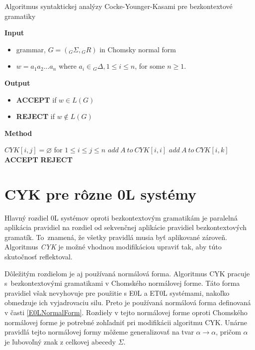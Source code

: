 \begin{algorithm}
\caption{Algoritmus syntaktickej analýzy Cocke-Younger-Kasami pre bezkontextové gramatiky}
\label{CYKBKG}

\textbf{Input}
\begin{itemize}[noitemsep]
    \item grammar, \(G = ({}_G\Sigma, {}_GR)\) in Chomsky normal form
    \item \(w = a_1a_2...a_n\)  where  \(a_i \in {}_G\Delta, 1 \leq i \leq n \), for some \(n \geq 1\).
\end{itemize}
\textbf{Output} 
\begin{itemize}[noitemsep]
    \item \textbf{ACCEPT} if \(w \in L(G)\)
    \item \textbf{REJECT} if \(w\notin L(G)\)
\end{itemize}
\textbf{Method}
\begin{algorithmic}
\State $ CYK[i,j] = \varnothing$ for $1 \leq i \leq j \leq n $
        \State $add\ A\ to\ CYK[i,i]$
    \EndIf
\EndFor
\Repeat
{}
\State $add\ A\ to\ CYK[i,k]$
\EndIf
{}
    \State \textbf{ACCEPT}
\Else
    \State \textbf{REJECT}
\EndIf

\end{algorithmic}
\end{algorithm}

\section{CYK pre rôzne 0L systémy}
Hlavný rozdiel 0L systémov oproti bezkontextovým gramatikám je paralelná aplikácia pravidiel na rozdiel od sekvenčnej aplikácie pravidiel bezkontextových gramatík. To~znamená, že všetky pravidlá musia byť aplikované zároveň. Algoritmus \textit{CYK} je možné vhodnou modifikáciou upraviť tak, aby túto skutočnosť reflektoval.

Dôležitým rozdielom je aj používaná normálová forma. Algoritmus CYK pracuje s~bezkontextovými gramatikami v Chomského normálovej forme. Táto forma pravidiel však nevyhovuje pre použitie s E0L a ET0L systémami, nakoľko obmedzuje ich vyjadrovaciu silu. Preto je používaná normálová forma definovaná v časti \ref{E0LNormalForm}. Rozdiely v tejto normálovej forme oproti Chomského normálovej forme je potrebné zohľadniť pri modifikácii algoritmu CYK. Unárne pravidlá tejto normálovej formy môžeme generalizovať na tvar $\alpha \to \alpha$, pričom $\alpha$ je ľubovoľný znak z celkovej abecedy $\Sigma$.


